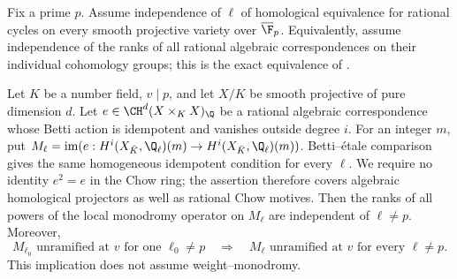 \begin{proposition}
\label{c:chow-unramified-rank-reduction}
Fix a prime $p$. Assume independence of $\ell$ of homological
equivalence for rational cycles on every smooth projective variety
over $\overline{\F}_p$. Equivalently, assume independence of the
ranks of all rational algebraic correspondences on their individual
cohomology groups; this is the exact equivalence of
\citet[Theorem~1, Definition~4.1 and Theorem~4.6]{c_vandobben2020}.

Let $K$ be a number field, $v\mid p$, and let $X/K$ be smooth
projective of pure dimension $d$. Let
$e\in\CH^d(X\times_KX)_\Q$ be a rational algebraic correspondence
whose Betti action is idempotent and vanishes outside degree $i$.
For an integer $m$, put
$M_\ell=\operatorname{im}(e:H^i(X_{\bar K},\Q_\ell)(m)
\to H^i(X_{\bar K},\Q_\ell)(m))$.
Betti--\'etale comparison gives the same homogeneous idempotent
condition for every $\ell$. We require no identity $e^2=e$ in
the Chow ring; the assertion therefore covers algebraic
homological projectors as well as rational Chow motives.
Then the ranks of all powers of the local monodromy operator on
$M_\ell$ are independent of $\ell\ne p$.
Moreover,
\[
 M_{\ell_0}\text{ unramified at }v\text{ for one }\ell_0\ne p
 \quad\Longrightarrow\quad
 M_\ell\text{ unramified at }v\text{ for every }\ell\ne p.
\]
This implication does not assume weight--monodromy.
\end{proposition}

